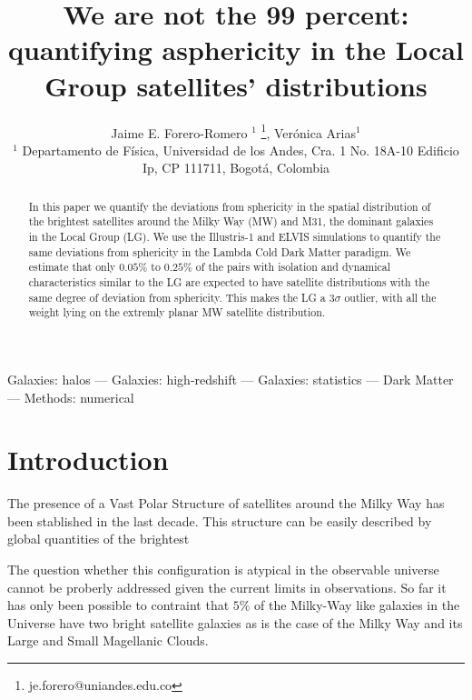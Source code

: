 \documentclass[a4paper,fleqn,usenatbib]{mnras}
\begin{document}
\title[LG satellites asphericity ]{We are not the 99 percent: quantifying
  asphericity in the Local Group satellites' distributions}
\author[J.E. Forero-Romero \& V. Arias]
{Jaime E. Forero-Romero $^{1}$ \thanks{je.forero@uniandes.edu.co},
Ver\'onica Arias$^1$\\
$^1$ Departamento de F\'isica, Universidad de los Andes, Cra. 1
  No. 18A-10 Edificio Ip, CP 111711, Bogot\'a, Colombia \\
}

\maketitle

\begin{abstract}
In this paper we quantify the deviations from sphericity in the spatial distribution of the
brightest satellites around the Milky Way (MW) and M31, the dominant
galaxies in the Local Group (LG).
We use the Illustris-1 and ELVIS simulations to quantify the
same deviations from sphericity in the Lambda Cold Dark Matter paradigm. 
We estimate that only $0.05\%$ to $0.25\%$ of the pairs with isolation
and dynamical characteristics similar to the LG are expected to have
satellite distributions with the same degree of deviation from
sphericity.
This makes the LG a $3\sigma$ outlier, with all the weight lying on
the extremly planar MW satellite distribution.
\end{abstract}

\begin{keywords}Galaxies: halos --- Galaxies: high-redshift --- Galaxies: statistics
--- Dark Matter --- Methods: numerical 
\end{keywords}

\section{Introduction}

The presence of a Vast Polar Structure of satellites around the Milky
Way has been stablished in the last decade.
This structure can be easily described by global quantities of the
brightest


The question whether this configuration is atypical in the observable
universe cannot be proberly addressed given the current limits in
observations. 
So far it has only been possible to contraint that $5\%$ of the
Milky-Way like galaxies in the Universe have two bright satellite
galaxies as is the case of the Milky Way and its Large and Small
Magellanic Clouds. 
\end{document}
